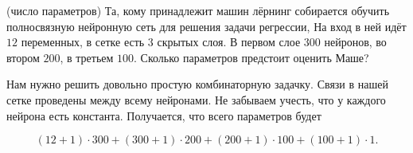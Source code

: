 \begin{problem}{(число параметров)}
Та, кому принадлежит машин лёрнинг собирается обучить полносвязную нейронную сеть для решения задачи регрессии, На вход в ней идёт $12$ переменных, в сетке есть $3$ скрытых слоя. В первом слое $300$ нейронов, во втором $200$, в третьем $100$.  Сколько параметров предстоит оценить Маше?
\end{problem}

\begin{sol} 
Нам нужно решить довольно простую комбинаторную задачку. Связи в нашей сетке проведены между всему нейронами. Не забываем учесть, что у каждого нейрона есть константа. Получается, что всего параметров будет

\[
(12 + 1) \cdot 300 + (300 + 1) \cdot 200 + (200 + 1) \cdot 100 + (100 + 1) \cdot 1.
\]

\end{sol} 
